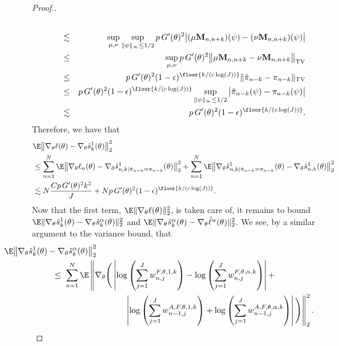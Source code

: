 \begin{proof}[Proof.]
\begin{eqnarray}
\\
    &\lesssim& \sup_{\mu, \nu} \sup_{\|\psi\|_\infty \leq 1/2} p \, G'(\theta)^2\big|(\mu \textbf{M}_{n,n+k})(\psi)-(\nu \textbf{M}_{n,n+k})(\psi)\big| 
\\
    &\leq& \sup_{\mu, \nu} p \, G'(\theta)^2\big\|\mu \textbf{M}_{n,n+k}-\nu \textbf{M}_{n,n+k}\big\|_{\mathrm{TV}} 
\\
    &\leq& p \, G'(\theta)^2(1-\epsilon)^{\floor{k/(c\log(J))}} \|\hat\pi_{n-k} - \pi_{n-k}\|_{\text{TV}} 
\\
    &\leq& p \, G'(\theta)^2(1-\epsilon)^{\floor{k/(c\log(J))}} \sup_{\|\psi\|_{\infty} \leq 1/2} \big|\hat\pi_{n-k}(\psi) - \pi_{n-k}(\psi)\big| 
\\
    &\lesssim& p \, G'(\theta)^2(1-\epsilon)^{\floor{k/(c\log(J))}}.
\end{eqnarray}
Therefore, we have that
\begin{align}
    &\E\big\|\nabla_\theta\ell(\theta) - \nabla_\theta\hat s_k^1(\theta)\big\|_2^2
    \nonumber \\
    &\leq \sum_{n=1}^N \E\big\|\nabla_\theta\ell_n(\theta) - \nabla_\theta\hat s_{n,k|\hat\pi_{n-k}=\pi_{n-k}}^1(\theta)\big\|_2^2 + \sum_{n=1}^N \E\big\|\nabla_\theta\hat s_{n,k|\hat\pi_{n-k}=\pi_{n-k}}^1(\theta) - \nabla_\theta\hat s_{n,k}^1(\theta)\big\|_2^2
    \nonumber \\
    &\lesssim N\frac{Cp \, G'(\theta)^2k^2}{J} + Np \, G'(\theta)^2(1-\epsilon)^{\floor{k/(c\log(J))}}.
\end{align}
Now that the first term, $\E\|\nabla_\theta\ell(\theta)\|_2^2$, is taken care of, it remains to bound 
$\E\|\nabla_\theta\hat s_k^1(\theta) - \nabla_\theta\hat s_k^\alpha(\theta)\|_2^2$ 
and
$\E\|\nabla_\theta\hat s_k^\alpha(\theta) -  \nabla_\theta\hat\ell^\alpha(\theta)\|_2^2$.
We see, by a similar argument to the variance bound, that
\begin{align}
    & \hspace{-20mm} \nonumber
    \E\big\|\nabla_\theta\hat s_k^1(\theta) - \nabla_\theta\hat s_k^\alpha(\theta)\big\|_2^2
    \\ \nonumber
    &\leq \; \sum_{n=1}^N \E\left\lVert\nabla_\theta \Bigg(\left|\log\left(\sum_{j=1}^Jw_{n,j}^{F,\theta,1,k}\right)- \log\left(\sum_{j=1}^Jw_{n,j}^{F,\theta,\alpha,k}\right)\right|
    + \right.
    \\ & \hspace{30mm} \left.
    \left|\log\left(\sum_{j=1}^Jw_{n-1,j}^{A, F,\theta,1,k}\right) + \log\left(\sum_{j=1}^Jw_{n-1,j}^{A, F,\theta,\alpha,k}\right)\right|\Bigg)\right\rVert_2^2.

\end{align}
\end{proof}
